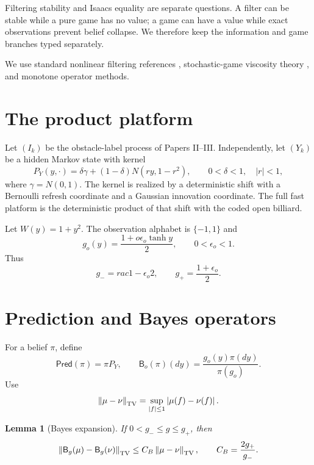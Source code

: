 \documentclass[11pt,reqno]{amsart}
\newtheorem{lemma}[theorem]{Lemma}
\theoremstyle{definition}
\theoremstyle{remark}
\newcommand{\norm}[1]{\left\lVert #1\right\rVert}
\newcommand{\abs}[1]{\left\lvert #1\right\rvert}
\begin{document}
Filtering stability and Isaacs equality are separate questions.  A filter can
be stable while a pure game has no value; a game can have a value while exact
observations prevent belief collapse.  We therefore keep the information and
game branches typed separately.

We use standard nonlinear filtering references
\cite{BainCrisan2009,AtarZeitouni1997,vanHandel2009}, stochastic-game
viscosity theory \cite{FlemingSouganidis1989,FlemingSoner2006}, and monotone
operator methods.

\section{The product platform}\label{sec:platform}

Let $(I_k)$ be the obstacle-label process of Papers II--III.  Independently,
let $(Y_k)$ be a hidden Markov state with kernel
\begin{equation}\label{eq:kernel}
 P_Y(y,\cdot)
 =
 \delta\gamma+(1-\delta)N(ry,1-r^2),
 \qquad
 0<\delta<1,\quad \abs r<1,
\end{equation}
where $\gamma=N(0,1)$.  The kernel is realized by a deterministic shift with
a Bernoulli refresh coordinate and a Gaussian innovation coordinate.  The
full fast platform is the deterministic product of that shift with the coded
open billiard.

Let $W(y)=1+y^2$.  The observation alphabet is $\{-1,1\}$ and
\begin{equation}\label{eq:likelihood}
 g_o(y)=\frac{1+o\epsilon_o\tanh y}{2},
 \qquad0<\epsilon_o<1.
\end{equation}
Thus
\[
 g_-=rac{1-\epsilon_o}{2},\qquad
 g_+=\frac{1+\epsilon_o}{2}.
\]

\section{Prediction and Bayes operators}\label{sec:filter}

For a belief $\pi$, define
\[
 \mathsf{Pred}(\pi)=\pi P_Y,\qquad
 \mathsf B_o(\pi)(dy)
 =
 \frac{g_o(y)\pi(dy)}{\pi(g_o)}.
\]
Use
\[
 \norm{\mu-\nu}_{\rm TV}
 =\sup_{\abs f\le1}\abs{\mu(f)-\nu(f)}.
\]

\begin{lemma}[Bayes expansion]\label{lem:bayes}
If $0<g_-\le g\le g_+$, then
\[
 \norm{\mathsf B_g(\mu)-\mathsf B_g(\nu)}_{\rm TV}
 \le
 C_B\norm{\mu-\nu}_{\rm TV},
 \qquad
 C_B=\frac{2g_+}{g_-}.
\]
\end{lemma}
\end{document}
